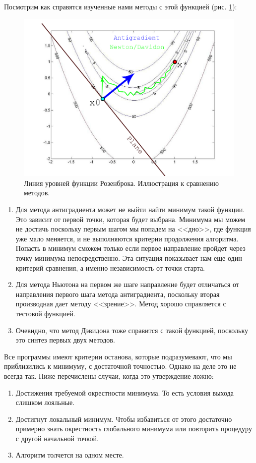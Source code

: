Посмотрим как справятся изученные нами методы с этой функцией (рис. \ref{fig:Rosenbrock_levels}):
\begin{figure}
    \centering
    \includegraphics[scale = 0.5]{Pictures/Rosenbrock_levels.png}
    \caption{Линия уровней функции Розенброка. Иллюстрация к сравнению методов.}
    \label{fig:Rosenbrock_levels}
\end{figure}
\begin{enumerate}
    \item Для метода антиградиента может не выйти найти минимум такой функции. Это зависит от первой точки, которая будет выбрана. Минимума мы можем не достичь поскольку первым шагом мы попадем на <<дно>>, где функция уже мало меняется, и не выполняются критерии продолжения алгоритма. Попасть в минимум сможем только если первое направление пройдет через точку минимума непосредственно. Эта ситуация показывает нам еще один критерий сравнения, а именно независимость от точки старта.
    \item Для метода Ньютона на первом же шаге направление будет отличаться от направления первого шага метода антиградиента, поскольку вторая производная дает методу <<зрение>>. Метод хорошо справляется с тестовой функцией.
    \item Очевидно, что метод Дэвидона тоже справится с такой функцией, поскольку это синтез первых двух методов.
\end{enumerate}
Все программы имеют критерии останова, которые подразумевают, что мы приблизились к минимуму, с достаточной точностью. Однако на деле это не всегда так. Ниже перечислены случаи, когда это утверждение ложно:
\begin{enumerate}
    \item Достижения требуемой окрестности минимума. То есть условия выхода слишком лояльные.
    \item Достигнут локальный минимум. Чтобы избавиться от этого достаточно примерно знать окрестность глобального минимума или повторить процедуру с другой начальной точкой.
    \item Алгоритм толчется на одном месте.
\end{enumerate}

